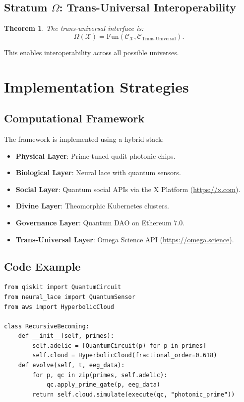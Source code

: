\documentclass[11pt]{article}
\newtheorem{theorem}{Theorem}
\newcommand{\Xi}{\mathcal{X}}
\begin{document}
\subsection{Stratum $\Omega$: Trans-Universal Interoperability}
\begin{theorem}
The \emph{trans-universal interface} is:
\[
\Omega(\Xi) = \text{Fun}(\mathcal{C}_{\Xi}, \mathcal{C}_{\text{Trans-Universal}}).
\]
\end{theorem}
This enables interoperability across all possible universes.

\section{Implementation Strategies}

\subsection{Computational Framework}
The framework is implemented using a hybrid stack:
\begin{itemize}
    \item \textbf{Physical Layer}: Prime-tuned qudit photonic chips.
    \item \textbf{Biological Layer}: Neural lace with quantum sensors.
    \item \textbf{Social Layer}: Quantum social APIs via the X Platform (\url{https://x.com}).
    \item \textbf{Divine Layer}: Theomorphic Kubernetes clusters.
    \item \textbf{Governance Layer}: Quantum DAO on Ethereum 7.0.
    \item \textbf{Trans-Universal Layer}: Omega Science API (\url{https://omega.science}).
\end{itemize}

\subsection{Code Example}
\begin{verbatim}
from qiskit import QuantumCircuit
from neural_lace import QuantumSensor
from aws import HyperbolicCloud

class RecursiveBecoming:
    def __init__(self, primes):
        self.adelic = [QuantumCircuit(p) for p in primes]
        self.cloud = HyperbolicCloud(fractional_order=0.618)
    def evolve(self, t, eeg_data):
        for p, qc in zip(primes, self.adelic):
            qc.apply_prime_gate(p, eeg_data)
        return self.cloud.simulate(execute(qc, "photonic_prime"))
\end{verbatim}
\end{document}
